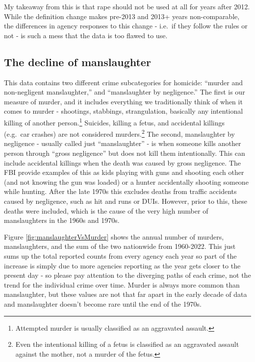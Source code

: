 \documentclass[
]{krantz}
\begin{document}
My takeaway from this is that rape should not be used at all
for years after 2012. While the definition change makes
pre-2013 and 2013+ years non-comparable, the differences in
agency responses to this change - i.e.~if they follow the
rules or not - is such a mess that the data is too flawed to
use.

\subsection{The decline of
manslaughter}\label{the-decline-of-manslaughter}

This data contains two different crime subcategories for
homicide: ``murder and non-negligent manslaughter,'' and
``manslaughter by negligence.'' The first is our measure of
murder, and it includes everything we traditionally think of
when it comes to murder - shootings, stabbings,
strangulation, basically any intentional killing of another
person.\footnote{Attempted murder is usually classified as
  an aggravated assault.} Suicides, killing a fetus, and
accidental killings (e.g.~car crashes) are not considered
murders.\footnote{Even the intentional killing of a fetus is
  classified as an aggravated assault against the mother,
  not a murder of the fetus.} The second, manslaughter by
negligence - usually called just ``manslaughter'' - is when
someone kills another person through ``gross negligence''
but does not kill them intentionally. This can include
accidental killings when the death was caused by gross
negligence. The FBI provide examples of this as kids playing
with guns and shooting each other (and not knowing the gun
was loaded) or a hunter accidentally shooting someone while
hunting. After the late 1970s this excludes deaths from
traffic accidents caused by negligence, such as hit and runs
or DUIs. However, prior to this, these deaths were included,
which is the cause of the very high number of manslaughters
in the 1960s and 1970s.

Figure \ref{fig:manslaughterVsMurder} shows the annual
number of murders, manslaughters, and the sum of the two
nationwide from 1960-2022. This just sums up the total
reported counts from every agency each year so part of the
increase is simply due to more agencies reporting as the
year gets closer to the present day - so please pay
attention to the diverging paths of each crime, not the
trend for the individual crime over time. Murder is always
more common than manslaughter, but these values are not that
far apart in the early decade of data and manslaughter
doesn't become rare until the end of the 1970s.
\end{document}
